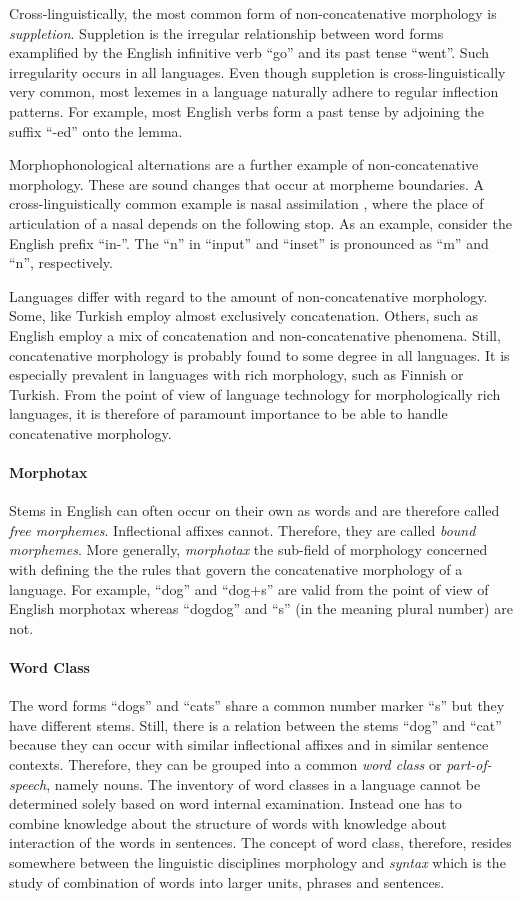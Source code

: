 Cross-linguistically, the most common form of non-concatenative
morphology is {\it suppletion}. Suppletion is the irregular
relationship between word forms examplified by the English infinitive
verb ``go'' and its past tense ``went''. Such irregularity occurs in
all languages. Even though suppletion is cross-linguistically very
common, most lexemes in a language naturally adhere to regular inflection
patterns. For example, most English verbs form a past tense by
adjoining the suffix ``-ed'' onto the lemma. 

Morphophonological alternations are a further example of
non-concatenative morphology. These are sound changes that occur at
morpheme boundaries. A cross-linguistically common example is nasal
assimilation \citep[p. 29]{Carr1993}, where the place of articulation
of a nasal depends on the following stop. As an example, consider the
English prefix ``in-''. The ``n'' in ``input'' and ``inset'' is
pronounced as ``m'' and ``n'', respectively.

Languages differ with regard to the amount of non-concatenative
morphology. Some, like Turkish employ almost exclusively
concatenation.  Others, such as English employ a mix of concatenation
and non-concatenative phenomena. Still, concatenative morphology is
probably found to some degree in all languages. It is especially
prevalent in languages with rich morphology, such as Finnish or
Turkish. From the point of view of language technology for
morphologically rich languages, it is therefore of paramount
importance to be able to handle concatenative morphology.

\paragraph{Morphotax} Stems in English can often occur on their own as
words and are therefore called {\it free morphemes}. Inflectional
affixes cannot. Therefore, they are called {\it bound morphemes}. More
generally, {\it morphotax} the sub-field of morphology concerned with
defining the the rules that govern the concatenative morphology of a
language. For example, ``dog'' and ``dog+s'' are valid from the point
of view of English morphotax whereas ``dogdog'' and ``s'' (in the
meaning plural number) are not.

\paragraph{Word Class} The word forms ``dogs'' and ``cats'' share a
common number marker ``s'' but they have different stems. Still, there
is a relation between the stems ``dog'' and ``cat'' because they can
occur with similar inflectional affixes and in similar sentence
contexts. Therefore, they can be grouped into a common {\it word
  class} or {\it part-of-speech}, namely nouns.  The inventory of word
classes in a language cannot be determined solely based on word
internal examination. Instead one has to combine knowledge about the
structure of words with knowledge about interaction of the words in
sentences. The concept of word class, therefore, resides somewhere
between the linguistic disciplines morphology and {\it syntax} which
is the study of combination of words into larger units, phrases and
sentences.

